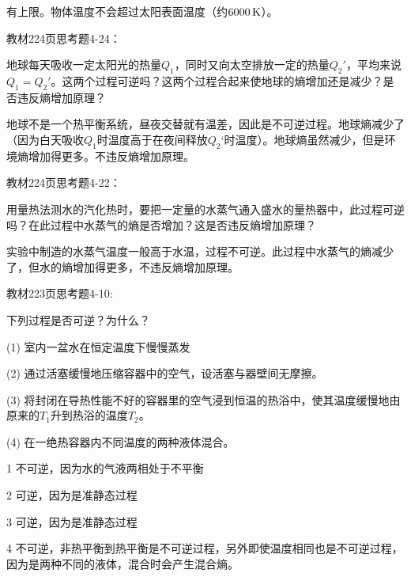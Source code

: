 \documentclass[CJK]{beamer}
\begin{document}
\begin{frame}
  \bch
  有上限。物体温度不会超过太阳表面温度（约$6000\,\mathrm{K}$）。
  \ech
\end{frame}

\begin{frame}
  \chtitle{\proid (\sthree)}
  \bch
  教材224页思考题4-24：

  地球每天吸收一定太阳光的热量$Q_1$，同时又向太空排放一定的热量$Q_2'$，平均来说$Q_1 = Q_2'$。这两个过程可逆吗？这两个过程合起来使地球的熵增加还是减少？是否违反熵增加原理？
  \ech
\end{frame}


\begin{frame}
  \bch
  地球不是一个热平衡系统，昼夜交替就有温差，因此是不可逆过程。地球熵减少了（因为白天吸收$Q_1$时温度高于在夜间释放$Q_2‘$时温度）。地球熵虽然减少，但是环境熵增加得更多。不违反熵增加原理。
  \ech
\end{frame}

\begin{frame}
  \chtitle{\proid (\stwo)}
  \bch
  教材224页思考题4-22：

  用量热法测水的汽化热时，要把一定量的水蒸气通入盛水的量热器中，此过程可逆吗？在此过程中水蒸气的熵是否增加？这是否违反熵增加原理？
  \ech
\end{frame}


\begin{frame}
  \bch
  实验中制造的水蒸气温度一般高于水温，过程不可逆。此过程中水蒸气的熵减少了，但水的熵增加得更多，不违反熵增加原理。
  \ech
\end{frame}

\begin{frame}
  \chtitle{\proid (\stwo)}
  \bch
  教材223页思考题4-10:

  下列过程是否可逆？为什么？
  \bitem
\item[(1)]{室内一盆水在恒定温度下慢慢蒸发}
\item[(2)]{通过活塞缓慢地压缩容器中的空气，设活塞与器壁间无摩擦。}
\item[(3)]{将封闭在导热性能不好的容器里的空气浸到恒温的热浴中，使其温度缓慢地由原来的$T_1$升到热浴的温度$T_2$。}
\item[(4)]{在一绝热容器内不同温度的两种液体混合。}
  \eitem
  \ech
\end{frame}


\begin{frame}
  \bch
  \bitem
\item[1]{不可逆，因为水的气液两相处于不平衡}
\item[2]{可逆，因为是准静态过程}
\item[3]{可逆，因为是准静态过程}
\item[4]{不可逆，非热平衡到热平衡是不可逆过程，另外即使温度相同也是不可逆过程，因为是两种不同的液体，混合时会产生混合熵。}
  \eitem
  \ech
\end{frame}
\end{document}
